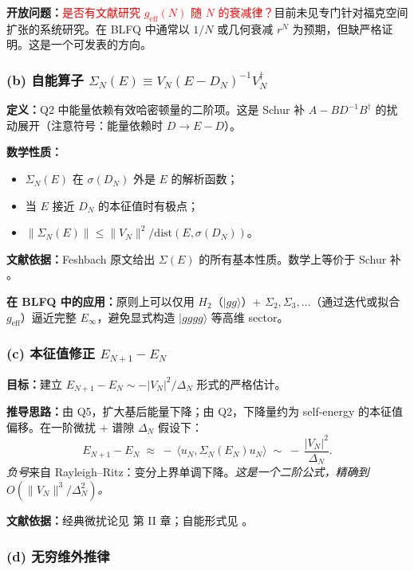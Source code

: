\documentclass{article}
\begin{document}
\textbf{开放问题：}\textcolor{red}{是否有文献研究 $g_{\mathrm{eff}}(N)$ 随 $N$ 的衰减律？}目前未见专门针对福克空间扩张的系统研究。在 BLFQ 中通常以 $1/N$ 或几何衰减 $r^{N}$ 为预期，但缺严格证明。这是一个可发表的方向。

\subsubsection*{(b) 自能算子 $\Sigma_{N}(E)\equiv V_{N}(E-D_{N})^{-1}V_{N}^{\dagger}$}

\textbf{定义：}Q2 中能量依赖有效哈密顿量的二阶项。这是 Schur 补 $A-BD^{-1}B^{\dagger}$ 的扰动展开（注意符号：能量依赖时 $D\to E-D$）。

\textbf{数学性质：}
\begin{itemize}
    \item $\Sigma_{N}(E)$ 在 $\sigma(D_{N})$ 外是 $E$ 的解析函数；
    \item 当 $E$ 接近 $D_{N}$ 的本征值时有极点；
    \item $\|\Sigma_{N}(E)\|\le \|V_{N}\|^{2}/\mathrm{dist}(E,\sigma(D_{N}))$。
\end{itemize}

\textbf{文献依据：}Feshbach \cite{Feshbach_1958} 原文给出 $\Sigma(E)$ 的所有基本性质。数学上等价于 Schur 补 \cite{Zhang_2005_Schur}。

\textbf{在 BLFQ 中的应用：}原则上可以仅用 $H_{2}$（$|gg\rangle$）+ $\Sigma_{2},\Sigma_{3},\dots$（通过迭代或拟合 $g_{\mathrm{eff}}$）逼近完整 $E_{\infty}$，避免显式构造 $|gggg\rangle$ 等高维 sector。

\subsubsection*{(c) 本征值修正 $E_{N+1}-E_{N}$}

\textbf{目标：}建立 $E_{N+1}-E_{N}\sim -|V_{N}|^{2}/\Delta_{N}$ 形式的严格估计。

\textbf{推导思路：}由 Q5，扩大基后能量下降；由 Q2，下降量约为 self-energy 的本征值偏移。在一阶微扰 + 谱隙 $\Delta_{N}$ 假设下：
\[
\boxed{\;E_{N+1}-E_{N}\;\approx\;-\,\langle u_{N},\Sigma_{N}(E_{N})u_{N}\rangle\;\sim\;-\,\frac{|V_{N}|^{2}}{\Delta_{N}}.\;}
\]
\emph{负号}来自 Rayleigh--Ritz：变分上界单调下降。\emph{这是一个二阶公式，精确到 $O(\|V_{N}\|^{3}/\Delta_{N}^{2})$。}

\textbf{文献依据：}经典微扰论见 \cite{Kato_1976} 第 II 章；自能形式见 \cite{Feshbach_1958}。

\subsubsection*{(d) 无穷维外推律}
\end{document}
